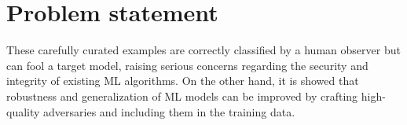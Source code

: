 \section{Problem statement}\label{sec:problem-statement}
These carefully curated examples are correctly classified by a human observer but can fool a target model, raising serious concerns regarding the security and integrity of existing ML algorithms. On the other hand, it is showed that robustness and generalization of ML models can be improved by crafting high-quality adversaries and including them in the training data.

